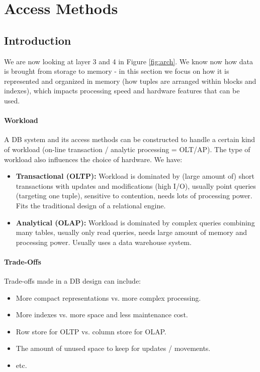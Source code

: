 \section{Access Methods}

\subsection{Introduction}

We are now looking at layer 3 and 4 in Figure \ref{fig:arch}. We know now how data is brought from storage to memory - in this section we focus on how it is represented and organized in memory (how tuples are arranged within blocks and indexes), which impacts processing speed and hardware features that can be used.

\paragraph{Workload}
A DB system and its access methods can be constructed to handle a certain kind of workload (on-line transaction / analytic processing = OLT/AP). The type of workload also influences the choice of hardware. We have:
\begin{itemize}
    \item \textbf{Transactional (OLTP):} Workload is dominated by (large amount of) short transactions with updates and modifications (high I/O), usually point queries (targeting one tuple), sensitive to contention, needs lots of processing power. Fits the traditional design of a relational engine.
    \item \textbf{Analytical (OLAP):} Workload is dominated by complex queries combining many tables, usually only read queries, needs large amount of memory and processing power. Usually uses a data warehouse system.
\end{itemize}

\paragraph{Trade-Offs}
Trade-offs made in a DB design can include:
\begin{itemize}
    \item More compact representations vs. more complex processing.
    \item More indexes vs. more space and less maintenance cost.
    \item Row store for OLTP vs. column store for OLAP.
    \item The amount of unused space to keep for updates / movements.
    \item etc.
\end{itemize}



